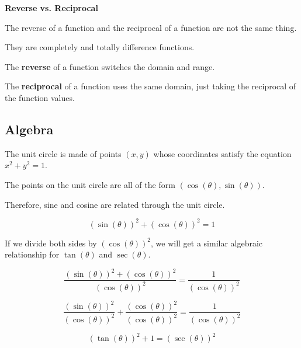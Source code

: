 \documentclass{ximera}
\begin{document}
\begin{warning} \textbf{\textcolor{red!70!black}{Reverse vs. Reciprocal}} 


The reverse of a function and the reciprocal of a function are not the same thing.

They are completely and totally difference functions.


The \textbf{reverse} of a function switches the domain and range.


The \textbf{reciprocal} of a function uses the same domain, just taking the reciprocal of the function values.




\end{warning}



















\subsection*{Algebra}


The unit circle is made of points $(x,y)$ whose coordinates satisfy the equation $x^2 + y^2 = 1$.

The points on the unit circle are all of the form $(\cos(\theta), \sin(\theta))$.

Therefore, sine and cosine are related through the unit circle.

\[
(\sin(\theta))^2 + (\cos(\theta))^2 = 1
\]



If we divide both sides by $(\cos(\theta))^2$, we will get a similar algebraic relationship for $\tan(\theta)$ and $\sec(\theta)$.




\[
\frac{(\sin(\theta))^2 + (\cos(\theta))^2}{(\cos(\theta))^2} = \frac{1}{(\cos(\theta))^2}
\]





\[
\frac{(\sin(\theta))^2}{(\cos(\theta))^2} + \frac{(\cos(\theta))^2}{(\cos(\theta))^2} = \frac{1}{(\cos(\theta))^2}
\]





\[
(\tan(\theta))^2 + 1 = (\sec(\theta))^2
\]
\end{document}
